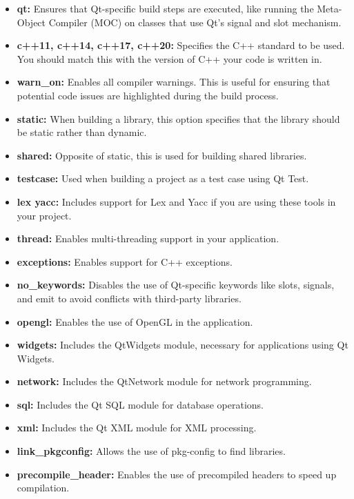 \documentclass{report}
\begin{document}
\begin{itemize}
\begin{itemize}
                \item \textbf{qt:} Ensures that Qt-specific build steps are executed, like running the Meta-Object Compiler (MOC) on classes that use Qt's signal and slot mechanism.
                \item \textbf{c++11, c++14, c++17, c++20:} Specifies the C++ standard to be used. You should match this with the version of C++ your code is written in.
                \item \textbf{warn\_on:} Enables all compiler warnings. This is useful for ensuring that potential code issues are highlighted during the build process.
                \item \textbf{static:} When building a library, this option specifies that the library should be static rather than dynamic.
                \item \textbf{shared:} Opposite of static, this is used for building shared libraries.
                \item \textbf{testcase:} Used when building a project as a test case using Qt Test.
                \item \textbf{lex yacc:} Includes support for Lex and Yacc if you are using these tools in your project.
                \item \textbf{thread:} Enables multi-threading support in your application.
                \item \textbf{exceptions:} Enables support for C++ exceptions.
                \item \textbf{no\_keywords:} Disables the use of Qt-specific keywords like slots, signals, and emit to avoid conflicts with third-party libraries.
                \item \textbf{opengl:} Enables the use of OpenGL in the application.
                \item \textbf{widgets:} Includes the QtWidgets module, necessary for applications using Qt Widgets.
                \item \textbf{network:} Includes the QtNetwork module for network programming.
                \item \textbf{sql:} Includes the Qt SQL module for database operations.
                \item \textbf{xml:} Includes the Qt XML module for XML processing.
                \item \textbf{link\_pkgconfig:} Allows the use of pkg-config to find libraries.
                \item \textbf{precompile\_header:} Enables the use of precompiled headers to speed up compilation.

\end{itemize}
\end{itemize}
\end{document}
